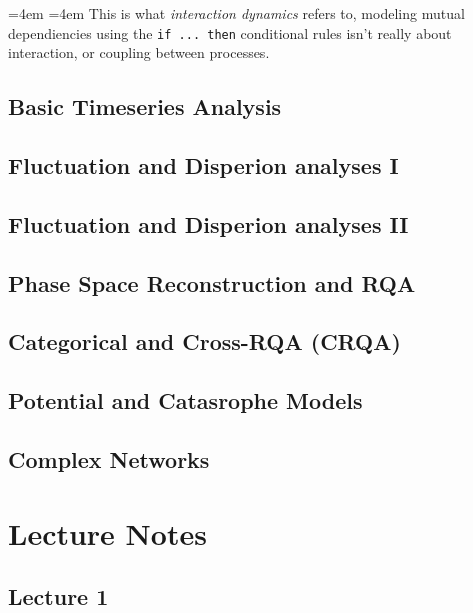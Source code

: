 \documentclass[]{book}
\renewenvironment{quote}{%
  \par \small \medskip \block
  \leftskip=4em \rightskip=4em%
  \noindent \ignorespaces}{%
  \par \medskip
  }
\begin{document}
\begin{quote}
This is what \emph{interaction dynamics} refers to, modeling mutual
dependiencies using the \texttt{if\ ...\ then} conditional rules isn't
really about interaction, or coupling between processes.
\end{quote}

\chapter{Basic Timeseries Analysis}\label{bta}

\chapter{Fluctuation and Disperion analyses I}\label{fda1}

\chapter{Fluctuation and Disperion analyses II}\label{fda2}

\chapter{Phase Space Reconstruction and RQA}\label{RQA}

\chapter{Categorical and Cross-RQA (CRQA)}\label{CRQA}

\chapter{Potential and Catasrophe Models}\label{cusp}

\chapter{Complex Networks}\label{nets}

\part{Lecture Notes}\label{part-lecture-notes}

\chapter*{Lecture 1}\label{lecture-1}
\end{document}
